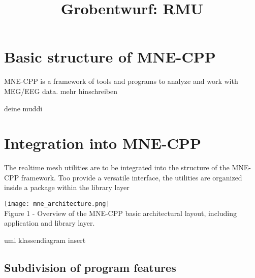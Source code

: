 \documentclass[a4paper, 11pt, ngerman, fleqn]{article}
\begin{document}
	
\title{Grobentwurf: RMU}
\vspace{3 in}
\maketitle
\clearpage

\tableofcontents

\clearpage
\section{Basic structure of MNE-CPP}

MNE-CPP is a framework of tools and programs to analyze and work with MEG/EEG data.
mehr hinschreiben 

\begin{description}
	\item[deine muddi]

\end{description}

\clearpage

\section{Integration into MNE-CPP}

The realtime mesh utilities are to be integrated into the structure of the MNE-CPP framework. Too provide a versatile interface, the utilities are organized inside a package within the library layer


\begin{center}
	\texttt{[image: mne\_architecture.png]}
	\\
	{Figure 1 - Overview of the MNE-CPP basic architectural layout, including application and library layer.}
\end{center}

uml klassendiagram insert

\subsection{Subdivision of program features}
\end{document}
